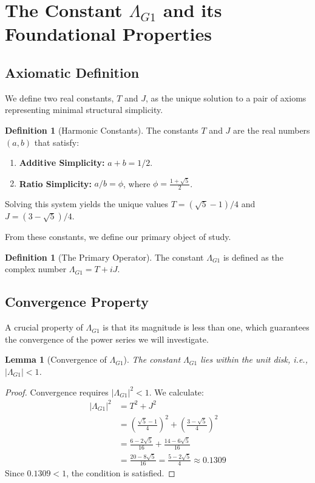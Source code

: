 \documentclass{amsart}
\theoremstyle{plain}
\newtheorem{lemma}[theorem]{Lemma}
\theoremstyle{definition}
\newtheorem{definition}[theorem]{Definition}
\theoremstyle{remark}
\newcommand{\LambdaG}{\Lambda_{G1}}
\begin{document}
\section{The Constant \texorpdfstring{$\Lambda_{G1}$}{Lambda\_G1} and its Foundational Properties}

\subsection{Axiomatic Definition}
We define two real constants, $T$ and $J$, as the unique solution to a pair of axioms representing minimal structural simplicity.

\begin{definition}[Harmonic Constants]
The constants $T$ and $J$ are the real numbers $(a,b)$ that satisfy:
\begin{enumerate}
    \item \textbf{Additive Simplicity:} $a+b = 1/2$.
    \item \textbf{Ratio Simplicity:} $a/b = \phi$, where $\phi = \frac{1+\sqrt{5}}{2}$.
\end{enumerate}
Solving this system yields the unique values $T = (\sqrt{5}-1)/4$ and $J = (3-\sqrt{5})/4$.
\end{definition}

From these constants, we define our primary object of study.
\begin{definition}[The Primary Operator]
The constant $\LambdaG$ is defined as the complex number $\LambdaG = T+iJ$.
\end{definition}

\subsection{Convergence Property}
A crucial property of $\LambdaG$ is that its magnitude is less than one, which guarantees the convergence of the power series we will investigate.

\begin{lemma}[Convergence of $\LambdaG$]
The constant $\LambdaG$ lies within the unit disk, i.e., $|\LambdaG| < 1$.
\end{lemma}
\begin{proof}
Convergence requires $|\LambdaG|^2 < 1$. We calculate:
\begin{align*}
    |\LambdaG|^2 &= T^2+J^2 \\
                 &= \left(\frac{\sqrt{5}-1}{4}\right)^2 + \left(\frac{3-\sqrt{5}}{4}\right)^2 \\
                 &= \frac{6-2\sqrt{5}}{16} + \frac{14-6\sqrt{5}}{16} \\
                 &= \frac{20-8\sqrt{5}}{16} = \frac{5-2\sqrt{5}}{4} \approx 0.1309
\end{align*}
Since $0.1309 < 1$, the condition is satisfied.
\end{proof}
\end{document}

